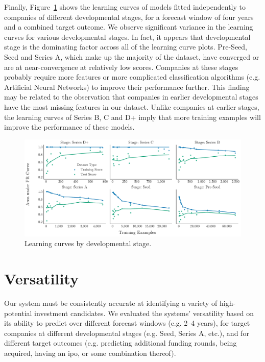 \documentclass[../thesis/thesis.tex]{subfiles}
\begin{document}
Finally, Figure~\ref{fig:evaluation:learning_stage} shows the learning curves of models fitted independently to companies of different developmental stages, for a forecast window of four years and a combined target outcome. We observe significant variance in the learning curves for various developmental stages. In fact, it appears that developmental stage is the dominating factor across all of the learning curve plots. Pre-Seed, Seed and Series A, which make up the majority of the dataset, have converged or are at near-convergence at relatively low scores. Companies at these stages probably require more features or more complicated classification algorithms (e.g. Artificial Neural Networks) to improve their performance further. This finding may be related to the observation that companies in earlier developmental stages have the most missing features in our dataset. Unlike companies at earlier stages, the learning curves of Series B, C and D+ imply that more training examples will improve the performance of these models.

\begin{figure}[!htb]
    \centering
    \includegraphics[width=\textwidth]{../figures/evaluation/learning_curves_stage}
    \caption[Learning curves by developmental stage]{Learning curves by developmental stage.}
    \label{fig:evaluation:learning_stage}
\end{figure}

\section{Versatility}

Our system must be consistently accurate at identifying a variety of high-potential investment candidates. We evaluated the systems' versatility based on its ability to predict over different forecast windows (e.g. 2--4 years), for target companies at different developmental stages (e.g. Seed, Series A, etc.), and for different target outcomes (e.g. predicting additional funding rounds, being acquired, having an \gls{ipo}, or some combination thereof).
\end{document}
